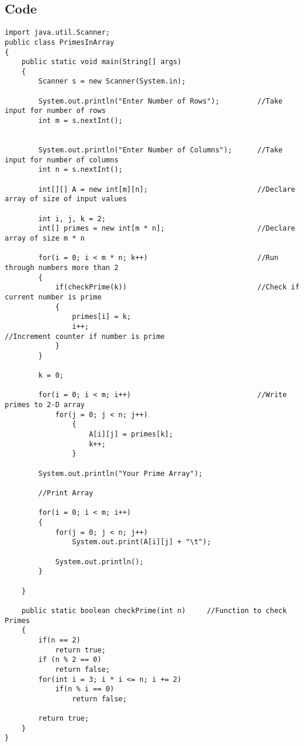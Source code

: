 \documentclass[ProgramminAssignment.tex]{subfiles}
\begin{document}
\subsection{Code}
\begin{lstlisting}
import java.util.Scanner;
public class PrimesInArray
{
	public static void main(String[] args)
	{
		Scanner s = new Scanner(System.in);
		
		System.out.println("Enter Number of Rows");			//Take input for number of rows
		int m = s.nextInt();
		
		
		System.out.println("Enter Number of Columns");		//Take input for number of columns
		int n = s.nextInt();
		
		int[][] A = new int[m][n];							//Declare array of size of input values
		
		int i, j, k = 2;
		int[] primes = new int[m * n];						//Declare array of size m * n
		
		for(i = 0; i < m * n; k++)							//Run through numbers more than 2
		{
			if(checkPrime(k))								//Check if current number is prime
			{
				primes[i] = k;
				i++;										//Increment counter if number is prime
			}
		}
		
		k = 0;
		
		for(i = 0; i < m; i++)								//Write primes to 2-D array
			for(j = 0; j < n; j++)
				{
					A[i][j] = primes[k];
					k++;
				}
		
		System.out.println("Your Prime Array");
		
		//Print Array
		
		for(i = 0; i < m; i++)
		{
			for(j = 0; j < n; j++)
				System.out.print(A[i][j] + "\t");
			
			System.out.println();
		}
		
	}
	
	public static boolean checkPrime(int n)		//Function to check Primes
	{
		if(n == 2)
			return true;
		if (n % 2 == 0) 
			return false;
	    for(int i = 3; i * i <= n; i += 2) 
	        if(n % i == 0)
	            return false;
	    
	    return true;
	}
}
\end{lstlisting}
\end{document}
